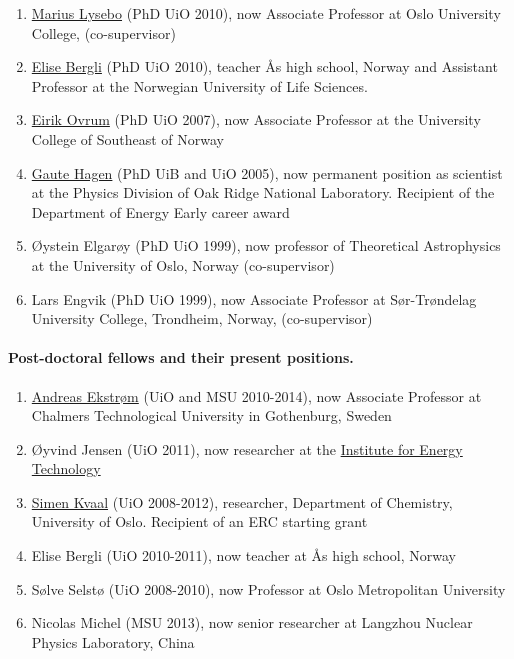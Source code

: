 \documentclass[%
oneside,                 %
final,                   %
10pt]{article}
\begin{document}
\begin{enumerate}
\item \href{{https://www.hioa.no/tilsatt/marlys}}{Marius Lysebo} (PhD UiO 2010), now Associate Professor at Oslo University College, (co-supervisor)

\item \href{{http://www.aas.vgs.no/om-oss/organisasjon/alle-ansatte/}}{Elise Bergli} (PhD UiO 2010), teacher Ås high school, Norway and Assistant Professor at the Norwegian University of Life Sciences.

\item \href{{https://www.hbv.no/om-hbv-kontakt-oss-ansatte/eirik-ovrum-article125026-6688.html}}{Eirik Ovrum} (PhD UiO 2007), now Associate Professor at the University College of Southeast of Norway

\item \href{{https://www.ornl.gov/staff-profile/gaute-hagen}}{Gaute Hagen} (PhD UiB and UiO 2005), now permanent position as scientist at the Physics Division of Oak Ridge National Laboratory. Recipient of the Department of Energy Early career award

\item Øystein Elgarøy (PhD UiO 1999), now professor of Theoretical Astrophysics at the University of Oslo, Norway (co-supervisor)

\item Lars Engvik (PhD UiO 1999), now Associate Professor at Sør-Trøndelag University College, Trondheim, Norway, (co-supervisor)
\end{enumerate}

\noindent
\paragraph{Post-doctoral fellows and their present positions.}
\begin{enumerate}
\item \href{{https://www.chalmers.se/en/Staff/Pages/Andreas-Ekstrom.aspx}}{Andreas Ekstrøm} (UiO and MSU 2010-2014), now Associate Professor  at Chalmers Technological University in Gothenburg, Sweden

\item Øyvind Jensen (UiO 2011), now researcher at the \href{{https://www.ife.no/en}}{Institute for Energy Technology}

\item \href{{http://www.mn.uio.no/kjemi/english/people/aca/simenkv/index.html}}{Simen Kvaal} (UiO 2008-2012), researcher,  Department of Chemistry, University of Oslo. Recipient of an ERC starting grant

\item Elise Bergli (UiO 2010-2011), now teacher at Ås high school, Norway

\item Sølve Selstø (UiO 2008-2010), now  Professor at Oslo Metropolitan University

\item Nicolas Michel (MSU 2013), now senior researcher at Langzhou Nuclear Physics Laboratory, China
\end{enumerate}
\end{document}
